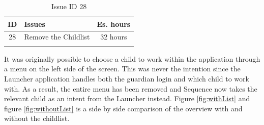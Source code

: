 \begin{longtable} { | c | p{12cm} | c | } 
\hline
	ID 	&	Issues	&		 Es. hours \\\hline
	28 	&	Remove the Childlist	&	32 hours \\\hline
\caption{Issue ID 28}
\label{tab:spr2_removechildlist}
\end{longtable}

It was originally possible to choose a child to work within the application through a menu on the left side of the screen. This was never the intention since the Launcher application handles both the guardian login and which child to work with. As a result, the entire menu has been removed and Sequence now takes the relevant child as an intent from the Launcher instead. Figure \ref{fig:withList} and figure \ref{fig:withoutList} is a side by side comparison of the overview with and without the childlist. 

